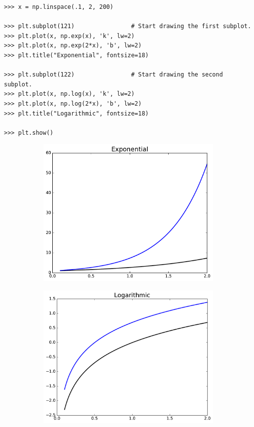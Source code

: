 \begin{lstlisting}
>>> x = np.linspace(.1, 2, 200)

>>> plt.subplot(121)                # Start drawing the first subplot.
>>> plt.plot(x, np.exp(x), 'k', lw=2)
>>> plt.plot(x, np.exp(2*x), 'b', lw=2)
>>> plt.title("Exponential", fontsize=18)

>>> plt.subplot(122)                # Start drawing the second subplot.
>>> plt.plot(x, np.log(x), 'k', lw=2)
>>> plt.plot(x, np.log(2*x), 'b', lw=2)
>>> plt.title("Logarithmic", fontsize=18)

>>> plt.show()
\end{lstlisting}

\begin{figure}[H] %
\captionsetup[subfigure]{justification=centering}
\centering
\begin{subfigure}{.49\textwidth}
    \centering
    \includegraphics[width=\linewidth]{figures/subplots_1.pdf}
\end{subfigure}
%
\begin{subfigure}{.49\textwidth}
    \centering
    \includegraphics[width=\linewidth]{figures/subplots_2.pdf}
\end{subfigure}
\end{figure}

